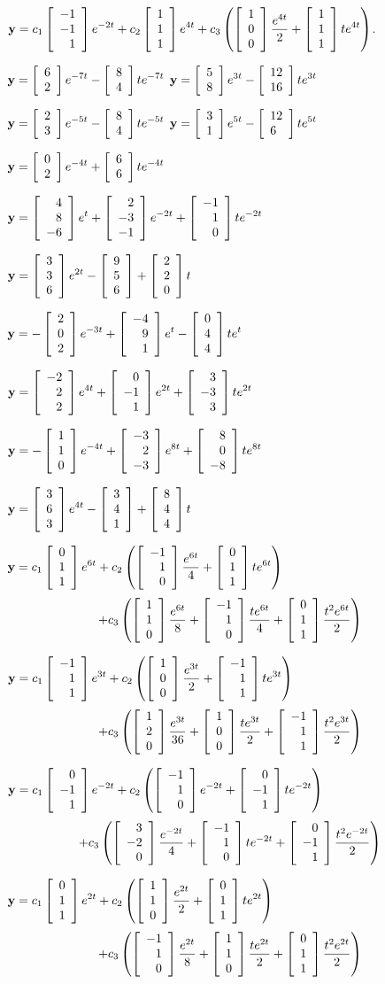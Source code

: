 \smallskip
{}
 ${\bf y}=\dst{
c_1\threecol{-1}{-1}1e^{-2t}+c_2\threecol111e^{4t}+c_3\left
(\threecol100{\frac{e^{4t}}{2}}+\threecol111te^{4t}\right)}$.

\smallskip
{}
${\bf y}=\dst{\twocol62e^{-7t}-\twocol84te^{-7t}}$
${\bf y}=\dst{\twocol58e^{3t}-\twocol{12}{16}te^{3t}}$

\smallskip
{}
${\bf y}=\dst{\twocol23e^{-5t}-\twocol84te^{-5t}}$
${\bf y}=\dst{\twocol31e^{5t}-\twocol{12}6te^{5t}}$

${\bf y}=\dst{\twocol02e^{-4t}+\twocol66te^{-4t}}$

\smallskip
{}
${\bf y}=\dst{\threecol48{-6}e^{t}+\threecol2{-3}{-1}e^{-2t}+
\threecol{-1}10te^{-2t}}$

\smallskip
{}
${\bf y}=\dst{\threecol336e^{2t}-\threecol956+\threecol220t}$

\smallskip
{}
${\bf y}=\dst{-\threecol202e^{-3t}+\threecol{-4}91e^{t}-
\threecol044te^{t}}$

\smallskip
{}
${\bf y}=\dst{\threecol{-2}22e^{4t}+\threecol0{-1}1e^{2t}+
\threecol3{-3}3te^{2t}}$

\smallskip
{}
${\bf y}=\dst{-\threecol110e^{-4t}+\threecol{-3}2{-3}e^{8t}+
\threecol80{-8}te^{8t}}$

\smallskip
{}
${\bf y}=\dst{\threecol363e^{4t}-\threecol341+\threecol844t}$

${\bf y}=\dst{c_{1}\threecol011e^{6t}+
c_{2}\left(\threecol{-1}10{\frac{e^{6t}}{4}}+\threecol011te^{6t}\right)}$
$$+c_{3}\left(\threecol110{\frac{e^{6t}}{8}}+\threecol{-1}10{\frac{t
e^{6t}}{4}}+\threecol011{\frac{t^{2}e^{6t}}{2}}\right)$$

\smallskip
{}
 ${\bf y}=\dst{c_{1}\threecol{-1}11e^{3t}+
c_{2}\left(\threecol100{\frac{e^{3t}}{2}}+\threecol{-1}11te^{3t}\right)}$
$$+c_{3}\left(\threecol120{\frac{e^{3t}}{36}}+\threecol100
{\frac{te^{3t}}{2}}+\threecol{-1}11{\frac{t^{2}e^{3t}}{2}}\right)$$

\smallskip
{}
${\bf y}=\dst{c_{1}\threecol0{-1}1e^{-2t}+
c_{2}\left(\threecol{{-1}}10e^{-2t}+\threecol0{-1}1te^{-2t}\right)}$
$$+c_{3}\left(\threecol3{-2}0{\frac{e^{-2t}}{4}}+\threecol{-1}10t
e^{-2t}+\threecol0{-1}1{\frac{t^{2}e^{-2t}}{2}}\right)$$

\smallskip
{}
 ${\bf y}=\dst{c_{1}\threecol011e^{2t}+
c_{2}\left(\threecol110{\frac{e^{2t}}{2}}+\threecol011te^{2t}\right)}$
$$+c_{3}\left(\threecol{-1}10{\frac{e^{2t}}{8}}+\threecol110{\frac{t
e^{2t}}{2}}+\threecol011{\frac{t^{2}e^{2t}}{2}}\right)$$

